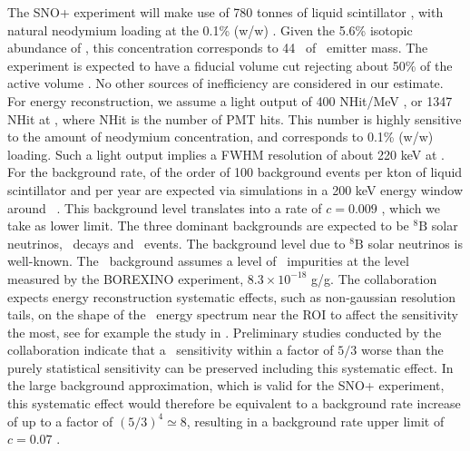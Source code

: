 The SNO+ experiment will make use of 780 tonnes of liquid scintillator \cite{OKeeffe:2011dex}, with natural neodymium loading at the 0.1\% (w/w) \cite{Wright:2009csa}. Given the 5.6\% isotopic abundance of \ND, this concentration corresponds to 44 \kgbb\ of \bb\ emitter mass. The experiment is expected to have a fiducial volume cut rejecting about 50\% of the active volume \cite{Wright:2009csa}. No other sources of inefficiency are considered in our estimate. For energy reconstruction, we assume a light output of 400 NHit/MeV \cite{Wright:2009csa}, or 1347 NHit at \Qbb, where NHit is the number of PMT hits. This number is highly sensitive to the amount of neodymium concentration, and corresponds to 0.1\% (w/w) loading. Such a light output implies a FWHM resolution of about 220 keV at \Qbb. For the background rate, of the order of 100 background events per kton of liquid scintillator and per year are expected via simulations in a 200 keV energy window around \Qbb\ \cite{Wright:2009csa}. This background level translates into a rate of $c=0.009$ \ckkbby, which we take as lower limit. The three dominant backgrounds are expected to be $^8\textrm{B}$ solar neutrinos, \TL\ decays and \bbtnu\ events. The background level due to $^8\textrm{B}$ solar neutrinos is well-known. The \TL\ background assumes a level of \THORIUM\ impurities at the level measured by the BOREXINO experiment, $8.3\times 10^{-18}$ g/g. The collaboration expects energy reconstruction systematic effects, such as non-gaussian resolution tails, on the shape of the \bbtnu\ energy spectrum near the ROI to affect the sensitivity the most, see for example the study in \cite{Wright:2009csa}. Preliminary studies conducted by the collaboration indicate that a \mbb\ sensitivity within a factor of $5/3$ worse than the purely statistical sensitivity can be preserved including this systematic effect. In the large background approximation, which is valid for the SNO+ experiment, this systematic effect would therefore be equivalent to a background rate increase of up to a factor of $(5/3)^4\simeq 8$, resulting in a background rate upper limit of $c=0.07$ \ckkbby.

